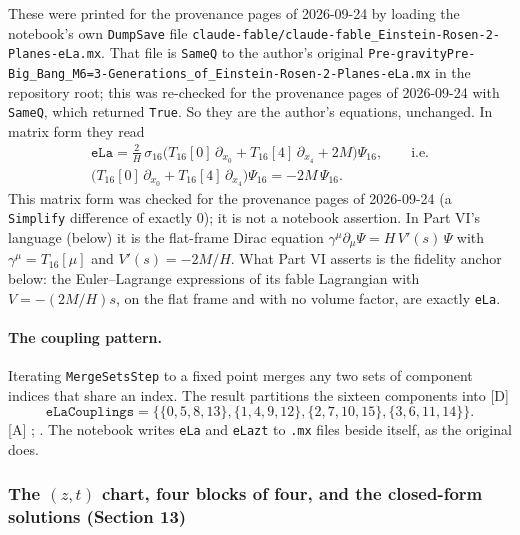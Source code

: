 These were printed for the provenance pages of 2026-09-24 by loading the notebook's own \texttt{DumpSave} file
\texttt{claude-fable/claude-fable\_Einstein-Rosen-2-Planes-eLa.mx}. That file is \texttt{SameQ} to
the author's original
\texttt{Pre-gravityPre-Big\_Bang\_M6=3-\allowbreak Generations\_of\_\allowbreak Einstein-Rosen-2-Planes-eLa.mx} in the
repository root; this was re-checked for the provenance pages of 2026-09-24 with \texttt{SameQ}, which returned
\texttt{True}. So they are the author's equations, unchanged. In matrix form they read
\begin{gather}
  \texttt{eLa} = \frac2H\,\sigma_{16}\bigl(T_{16}[0]\,\partial_{x_0}+T_{16}[4]\,\partial_{x_4}+2M\bigr)\Psi_{16},
  \qquad\text{i.e.}\\
  \bigl(T_{16}[0]\,\partial_{x_0}+T_{16}[4]\,\partial_{x_4}\bigr)\Psi_{16} = -2M\,\Psi_{16}.
\end{gather}
This matrix form was checked for the provenance pages of 2026-09-24 (a \texttt{Simplify} difference of exactly 0); it
is not a notebook assertion. In Part VI's language (below) it is the flat-frame Dirac equation
$\gamma^\mu\partial_\mu\Psi = H\,V'(s)\,\Psi$ with $\gamma^\mu=T_{16}[\mu]$ and $V'(s)=-2M/H$. What
Part VI asserts is the fidelity anchor below: the Euler--Lagrange expressions of its fable
Lagrangian with $V=-(2M/H)s$, on the flat frame and with no volume factor, are exactly
\texttt{eLa}.

\paragraph{The coupling pattern.} Iterating \texttt{MergeSetsStep} to a fixed point merges any
two sets of component indices that share an index. The result partitions the sixteen components
into [D]
\begin{equation}
  \texttt{eLaCouplings} = \{\{0,5,8,13\},\{1,4,9,12\},\{2,7,10,15\},\{3,6,11,14\}\}.
\end{equation}
[A] ;
. The notebook writes \texttt{eLa} and \texttt{eLazt} to
\texttt{.mx} files beside itself, as the original does.

\subsubsection{The \texorpdfstring{$(z,t)$}{(z,t)} chart, four blocks of four, and the closed-form solutions (Section 13)}
\label{fnd:zt}\label{sec:3.1.9}

